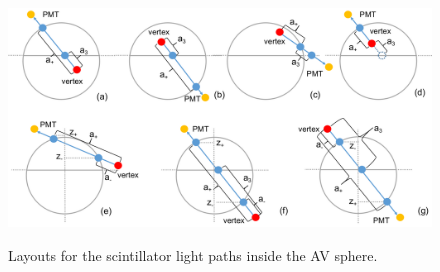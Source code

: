 \begin{figure}
	\centering
	{\includegraphics[width=130mm]{scintPathAV.png}}
	\caption{Layouts for the scintillator light paths inside the AV sphere.}\label{lightpath_scintAV}
\end{figure}

